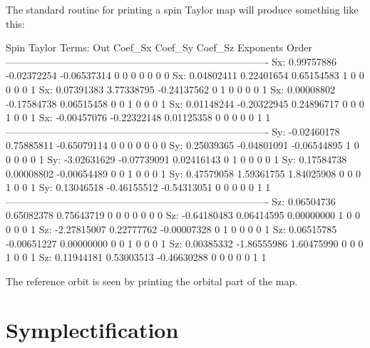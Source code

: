The standard \bmad routine for printing a spin Taylor map will produce
something like this:
\begin{example}
  Spin Taylor Terms:
  Out      Coef_Sx         Coef_Sy         Coef_Sz      Exponents           Order
  -------------------------------------------------------------------------------
  Sx:      0.99757886     -0.02372254     -0.06537314   0  0  0  0  0  0        0
  Sx:      0.04802411      0.22401654      0.65154583   1  0  0  0  0  0        1
  Sx:      0.07391383      3.77338795     -0.24137562   0  1  0  0  0  0        1
  Sx:      0.00008802     -0.17584738      0.06515458   0  0  1  0  0  0        1
  Sx:      0.01148244     -0.20322945      0.24896717   0  0  0  1  0  0        1
  Sx:     -0.00457076     -0.22322148      0.01125358   0  0  0  0  0  1        1
  -------------------------------------------------------------------------------
  Sy:     -0.02460178      0.75885811     -0.65079114   0  0  0  0  0  0        0
  Sy:      0.25039365     -0.04801091     -0.06544895   1  0  0  0  0  0        1
  Sy:     -3.02631629     -0.07739091      0.02416143   0  1  0  0  0  0        1
  Sy:      0.17584738      0.00008802     -0.00654489   0  0  1  0  0  0        1
  Sy:      0.47579058      1.59361755      1.84025908   0  0  0  1  0  0        1
  Sy:      0.13046518     -0.46155512     -0.54313051   0  0  0  0  0  1        1
  -------------------------------------------------------------------------------
  Sz:      0.06504736      0.65082378      0.75643719   0  0  0  0  0  0        0
  Sz:     -0.64180483      0.06414595      0.00000000   1  0  0  0  0  0        1
  Sz:     -2.27815007      0.22777762     -0.00007328   0  1  0  0  0  0        1
  Sz:      0.06515785     -0.00651227      0.00000000   0  0  1  0  0  0        1
  Sz:      0.00385332     -1.86555986      1.60475990   0  0  0  1  0  0        1
  Sz:      0.11944181      0.53003513     -0.46630288   0  0  0  0  0  1        1
\end{example}
The reference orbit is seen by printing the orbital part of the map.

\section{Symplectification}
\label{s:symp.method}

